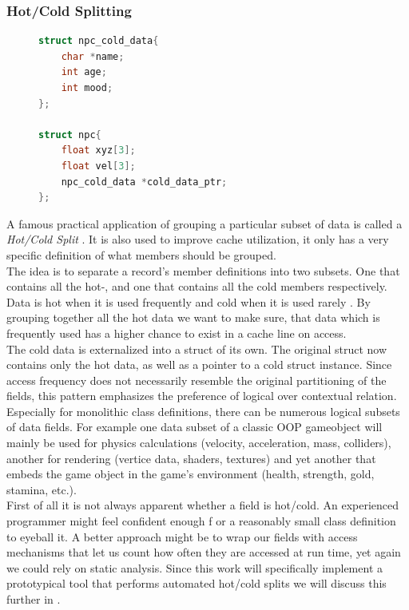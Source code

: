 \subsubsection{Hot/Cold Splitting}\label{hot_cold_splitting}
\begin{figure}
\begin{lstlisting}[language=C++,numbers=none,name={The NPC class split into hot/cold data},label={hcsplit_npc}]
struct npc_cold_data{
	char *name;
	int age;
	int mood;
};

struct npc{
	float xyz[3];
	float vel[3];
	npc_cold_data *cold_data_ptr;
};
\end{lstlisting}
\end{figure}
A famous practical application of grouping a particular subset of data is called a \textit{Hot/Cold Split} . It is also used to improve cache utilization, it only has a very specific definition of what members should be grouped.\\
The idea is to separate a record's member definitions into two subsets. One that contains all the hot-, and one that contains all the cold members respectively. Data is hot when it is used frequently and cold when it is used rarely . By grouping together all the hot data we want to make sure, that data which is frequently used has a higher chance to exist in a cache line on access.\\
The cold data is externalized into a struct of its own. The original struct now contains only the hot data, as well as a pointer to a cold struct instance. Since access frequency does not necessarily resemble the original partitioning of the fields, this pattern emphasizes the preference of logical over contextual relation.\\
Especially for monolithic class definitions, there can be numerous logical subsets of data fields. For example one data subset of a classic OOP gameobject will mainly be used for physics calculations (velocity, acceleration, mass, colliders), another for rendering (vertice data, shaders, textures) and yet another that embeds the game object in the game's environment (health, strength, gold, stamina, etc.).\\
First of all it is not always apparent whether a field is hot/cold. An experienced programmer might feel confident enough f or a reasonably small class definition to eyeball it. A better approach might be to wrap our fields with access mechanisms that let us count how often they are accessed at run time, yet again we could rely on static analysis. Since this work will specifically implement a prototypical tool that performs automated hot/cold splits we will discuss this further in .\\
